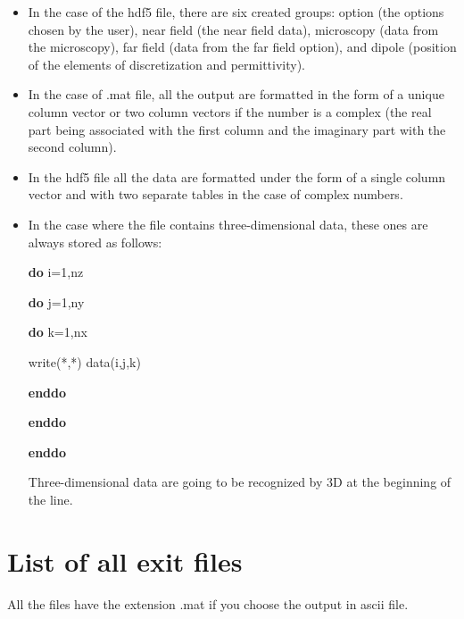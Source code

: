 \begin{itemize}

\item In the case of the hdf5 file, there are six created groups:
  option (the options chosen by the user), near field (the near field
  data), microscopy (data from the microscopy), far field (data from
  the far field option), and dipole (position of the elements of
  discretization and permittivity).

\item In the case of .mat file, all the output are formatted in the
  form of a unique column vector or two column vectors if the number
  is a complex (the real part being associated with the first column
  and the imaginary part with the second column).

\item In the hdf5 file all the data are formatted under the form of a
  single column vector and with two separate tables in the case of
  complex numbers.

\item In the case where the file contains three-dimensional data,
  these ones are always stored as follows:

\hspace{5mm} {\bf do} i=1,nz

  \hspace{10mm} {\bf do} j=1,ny

 \hspace{15mm} {\bf do} k=1,nx

      \hspace{20mm}  write(*,*) data(i,j,k)
         
   \hspace{15mm} {\bf enddo}

  \hspace{10mm} {\bf enddo}

 \hspace{5mm} {\bf enddo}

 Three-dimensional data are going to be recognized by 3D at the
 beginning of the line.
\end{itemize}

\section{List of all exit files}

All the files have the extension .mat if you choose the output in
ascii file. 

